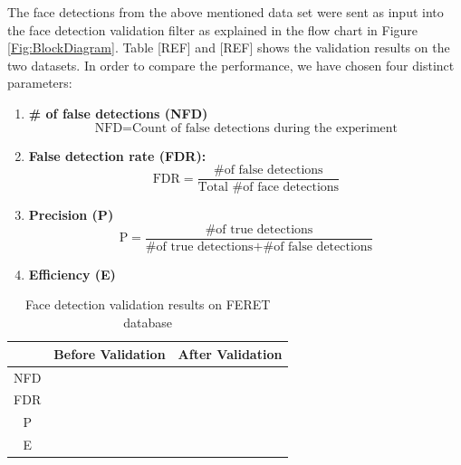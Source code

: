 \documentclass[times, 10pt,twocolumn]{article}
\begin{document}
 The face detections from the above mentioned data set were sent as
 input into the face detection validation filter as explained in the
 flow chart in Figure \ref{Fig:BlockDiagram}. Table [REF] and [REF] shows the
 validation results on the two datasets. In order to compare the
 performance, we have chosen four distinct parameters:
 \begin{enumerate}
 \item {\bf \# of false detections (NFD)}
 \begin{equation}
\mbox{NFD} = \mbox{Count of false detections during the experiment}
\nonumber
 \end{equation}
 \item {\bf False detection rate (FDR):} \begin{equation}
 \mbox{FDR} = \frac{\mbox{\# of false detections}}{\mbox{Total \# of face
 detections}} \nonumber
 \end{equation}
 \item {\bf Precision (P)}
 \begin{equation}
 \mbox{P} = \frac{\mbox{\# of true detections}}{\mbox{\# of true detections} + \mbox{\# of false
 detections}} \nonumber
 \end{equation}
 \item {\bf Efficiency (E)}
 \end{enumerate}

\begin{table}[ht]

 \begin{tabular}{|c||c|c|}
   \hline
    & Before Validation & After Validation \\
    \hline
    \hline
    NFD  &  &  \\
   FDR &  &  \\
   P &  &  \\
   E & & \\
   \hline
 \end{tabular}
 \vspace{0.2in}
\caption{Face detection validation results on FERET database}
\label{Tab:FERET}
\end{table}
\end{document}
